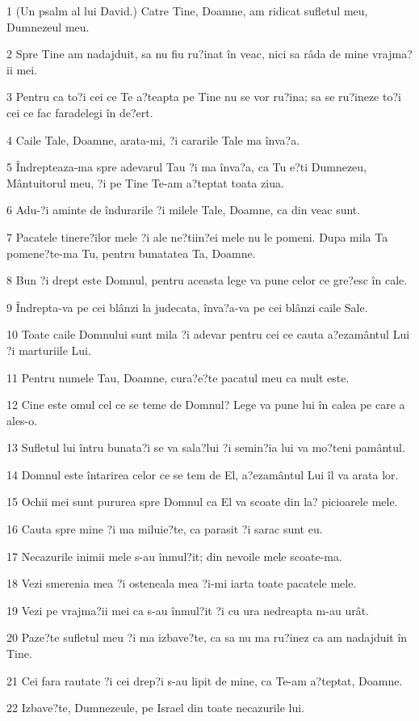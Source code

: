 \par 1 (Un psalm al lui David.) Catre Tine, Doamne, am ridicat sufletul meu, Dumnezeul meu.
\par 2 Spre Tine am nadajduit, sa nu fiu ru?inat în veac, nici sa râda de mine vrajma?ii mei.
\par 3 Pentru ca to?i cei ce Te a?teapta pe Tine nu se vor ru?ina; sa se ru?ineze to?i cei ce fac faradelegi în de?ert.
\par 4 Caile Tale, Doamne, arata-mi, ?i cararile Tale ma înva?a.
\par 5 Îndrepteaza-ma spre adevarul Tau ?i ma înva?a, ca Tu e?ti Dumnezeu, Mântuitorul meu, ?i pe Tine Te-am a?teptat toata ziua.
\par 6 Adu-?i aminte de îndurarile ?i milele Tale, Doamne, ca din veac sunt.
\par 7 Pacatele tinere?ilor mele ?i ale ne?tiin?ei mele nu le pomeni. Dupa mila Ta pomene?te-ma Tu, pentru bunatatea Ta, Doamne.
\par 8 Bun ?i drept este Domnul, pentru aceasta lege va pune celor ce gre?esc în cale.
\par 9 Îndrepta-va pe cei blânzi la judecata, înva?a-va pe cei blânzi caile Sale.
\par 10 Toate caile Domnului sunt mila ?i adevar pentru cei ce cauta a?ezamântul Lui ?i marturiile Lui.
\par 11 Pentru numele Tau, Doamne, cura?e?te pacatul meu ca mult este.
\par 12 Cine este omul cel ce se teme de Domnul? Lege va pune lui în calea pe care a ales-o.
\par 13 Sufletul lui întru bunata?i se va sala?lui ?i semin?ia lui va mo?teni pamântul.
\par 14 Domnul este întarirea celor ce se tem de El, a?ezamântul Lui îl va arata lor.
\par 15 Ochii mei sunt pururea spre Domnul ca El va scoate din la? picioarele mele.
\par 16 Cauta spre mine ?i ma miluie?te, ca parasit ?i sarac sunt eu.
\par 17 Necazurile inimii mele s-au înmul?it; din nevoile mele scoate-ma.
\par 18 Vezi smerenia mea ?i osteneala mea ?i-mi iarta toate pacatele mele.
\par 19 Vezi pe vrajma?ii mei ca s-au înmul?it ?i cu ura nedreapta m-au urât.
\par 20 Paze?te sufletul meu ?i ma izbave?te, ca sa nu ma ru?inez ca am nadajduit în Tine.
\par 21 Cei fara rautate ?i cei drep?i s-au lipit de mine, ca Te-am a?teptat, Doamne.
\par 22 Izbave?te, Dumnezeule, pe Israel din toate necazurile lui.


